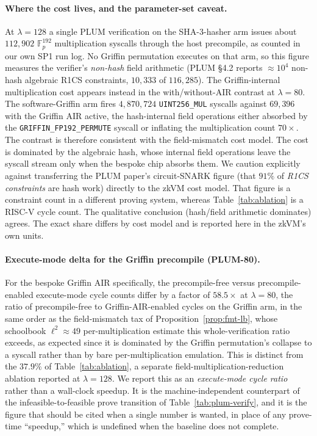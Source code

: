 \paragraph{Where the cost lives, and the parameter-set caveat.}
At $\lambda=128$ a single PLUM verification on the SHA-3-hasher arm issues about $112{,}902$ $\mathbb{F}_p^{192}$ multiplication syscalls through the host precompile, as counted in our own SP1 run log. No Griffin permutation executes on that arm, so this figure measures the verifier's \emph{non-hash} field arithmetic (PLUM \S4.2 reports $\approx 10^4$ non-hash algebraic R1CS constraints, $10{,}333$ of $116{,}285$). The Griffin-internal multiplication cost appears instead in the with/without-AIR contrast at $\lambda=80$. The software-Griffin arm fires $4{,}870{,}724$ \texttt{UINT256\_MUL} syscalls against $69{,}396$ with the Griffin AIR active, the hash-internal field operations either absorbed by the \texttt{GRIFFIN\_FP192\_PERMUTE} syscall or inflating the multiplication count $70\times$. The contrast is therefore consistent with the field-mismatch cost model. The cost is dominated by the algebraic hash, whose internal field operations leave the syscall stream only when the bespoke chip absorbs them. We caution explicitly against transferring the PLUM paper's circuit-SNARK figure (that $91\%$ of \emph{R1CS constraints} are hash work) directly to the zkVM cost model. That figure is a constraint count in a different proving system, whereas Table~\ref{tab:ablation} is a RISC-V cycle count. The qualitative conclusion (hash/field arithmetic dominates) agrees. The exact share differs by cost model and is reported here in the zkVM's own units.

\paragraph{Execute-mode delta for the Griffin precompile (PLUM-80).}
For the bespoke Griffin AIR specifically, the precompile-free versus precompile-enabled execute-mode cycle counts differ by a factor of $58.5\times$ at $\lambda=80$, the ratio of precompile-free to Griffin-AIR-enabled cycles on the Griffin arm, in the same order as the field-mismatch tax of Proposition~\ref{prop:fmt-lb}, whose schoolbook $\ell^2\approx 49$ per-multiplication estimate this whole-verification ratio exceeds, as expected since it is dominated by the Griffin permutation's collapse to a syscall rather than by bare per-multiplication emulation. This is distinct from the $37.9\%$ of Table~\ref{tab:ablation}, a separate field-multiplication-reduction ablation reported at $\lambda=128$. 
We report this as an \emph{execute-mode cycle ratio} rather than a wall-clock speedup. It is the machine-independent counterpart of the infeasible-to-feasible prove transition of Table~\ref{tab:plum-verify}, and it is the figure that should be cited when a single number is wanted, in place of any prove-time ``speedup,'' which is undefined when the baseline does not complete.


